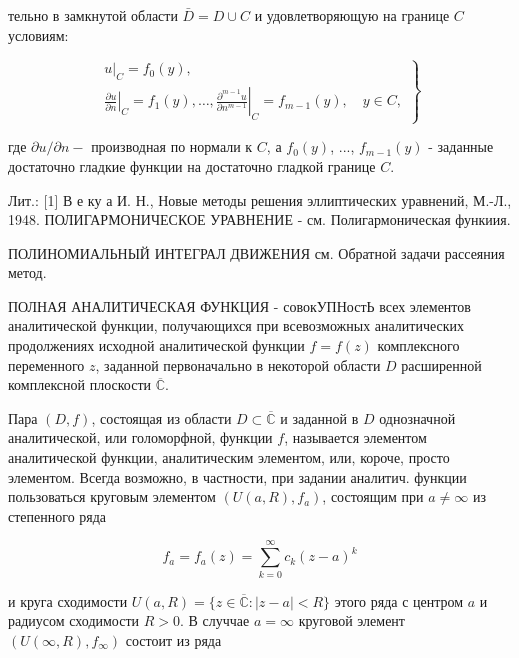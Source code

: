 \documentclass[10pt]{article}
\begin{document}
тельно в замкнутой области $\bar{D}=D \cup C$ и удовлетворяющую на границе $C$ условиям:



\[

\left.\begin{array}{l}

\left.u\right|_{C}=f_{0}(y), \\

\left.\frac{\partial u}{\partial n}\right|_{C}=f_{1}(y), \ldots,\left.\frac{\partial^{m-1} u}{\partial n^{m-1}}\right|_{C}=f_{m-1}(y), \quad y \in C,

\end{array}\right\}

\]



где $\partial u / \partial n-$ производная по нормали к $C$, а $f_{0}(y)$, ..., $f_{m-1}(y)$ - заданные достаточно гладкие функции на достаточно гладкой границе $C$.



Лит.: [1] В е ку а И. Н., Новые методы решения эллиптических уравнений, М.-Л., 1948. ПОЛИГАРМОНИЧЕСКОЕ УРАВНЕНИЕ - см. Полигармоническая функиия.



ПОЛИНОМИАЛЬНЫЙ ИНТЕГРАЛ ДВИЖЕНИЯ см. Обратной задачи рассеяния метод.



ПОЛНАЯ АНАЛИТИЧЕСКАЯ ФУНКЦИЯ - совокУПНостЬ всех элементов аналитической функции, получающихся при всевозможных аналитических продолжениях исходной аналитической функции $f=f(z)$ комплексного переменного $z$, заданной первоначально в некоторой области $D$ расширенной комплексной плоскости $\overline{\mathbb{C}}$.



Пара $(D, f)$, состоящая из области $D \subset \overline{\mathbb{C}}$ и заданной в $D$ однозначной аналитической, или голоморфной, функции $f$, называется элементом аналитической функции, аналитическим элементом, или, короче, просто элементом. Всегда возможно, в частности, при задании аналитич. функции пользоваться круговым элементом $\left(U(a, R), f_{a}\right)$, состоящим при $a \neq \infty$ из степенного ряда



\[

f_{a}=f_{a}(z)=\sum_{k=0}^{\infty} c_{k}(z-a)^{k}

\]



и круга сходимости $U(a, R)=\{z \in \overline{\mathbb{C}}:|z-a|<R\}$ этого ряда с центром $a$ и радиусом сходимости $R>0$. В случчае $a=\infty$ круговой элемент $\left(U(\infty, R), f_{\infty}\right)$ состоит из ряда
\end{document}
